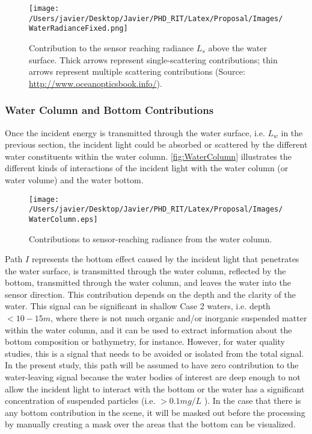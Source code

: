 \begin{figure}[htb]
  \centering
  \texttt{[image: /Users/javier/Desktop/Javier/PHD\_RIT/Latex/Proposal/Images/WaterRadianceFixed.png]}
\caption{Contribution to the sensor reaching radiance $L_s$ above the water surface. Thick arrows represent single-scattering contributions; thin arrows represent multiple scattering contributions (Source: \protect\url{http://www.oceanopticsbook.info/}).}
\label{fig:watercontribution} 
\end{figure}
\subsubsection{Water Column and Bottom Contributions}
Once the incident energy is transmitted through the water surface, i.e. $L_w$ in the previous section, the incident light could be absorbed or scattered by the different water constituents within the water column. \autoref{fig:WaterColumn} illustrates the different kinds of interactions of the incident light with the water column (or water volume) and the water bottom.

\begin{figure}[htb]
  \centering
      \texttt{[image: /Users/javier/Desktop/Javier/PHD\_RIT/Latex/Proposal/Images/WaterColumn.eps]}
  \caption{Contributions to sensor-reaching radiance from the water column.}
  \label{fig:WaterColumn}
\end{figure}

Path $I$ represents the bottom effect caused by the incident light that penetrates the water surface, is transmitted through the water column, reflected by the bottom, transmitted through the water column, and leaves the water into the sensor direction. This contribution depends on the depth and the clarity of the water. This signal can be significant in shallow Case 2 waters, i.e. depth $<10-15m$, where there is not much organic and/or inorganic suspended matter within the water column, and it can be used to extract information about the bottom composition or bathymetry, for instance. However, for water quality studies, this is a signal that needs to be avoided or isolated from the total signal. In the present study, this path will be assumed to have zero contribution to the water-leaving signal because the water bodies of interest are deep enough to not allow the incident light to interact with the bottom or the water has a significant concentration of suspended particles (i.e. $>0.1mg/L$ \citep{Pahlevan:2012}). In the case that there is any bottom contribution in the scene, it will be masked out before the processing by manually creating a mask over the areas that the bottom can be visualized.

